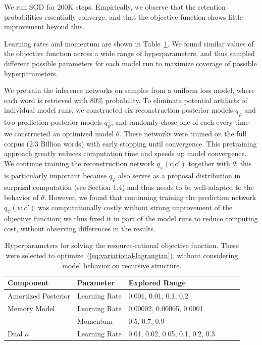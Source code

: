 We run SGD for 200K steps.
Empirically, we observe that the retention probabilities essentially converge, and that the objective function shows little improvement beyond this.


Learning rates and momentum are shown in Table~\ref{tab:hyperparameters}.
We found similar values of the objective function across a wide range of hyperparameters, and thus sampled different possible parameters for each model run to maximize coverage of possible hyperparameters.


We pretrain the inference networks on samples from a uniform loss model, where each word is
retrieved with 80\% probability. To eliminate potential artifacts of individual model runs, we constructed
six reconstruction posterior models $q_\varphi$ and two prediction posterior models $q_\psi$, and randomly chose
one of each every time we constructed an optimized model $\theta$. These networks were trained on the full
corpus (2.3 Billion words) with early stopping until convergence. This pretraining approach greatly
reduces computation time and speeds up model convergence. We continue training the reconstruction
network $q_\varphi(c|c')$ together with $\theta$; this is particularly important because $q_\varphi$ also serves as a proposal
distribution in surprisal computation (see Section 1.4) and thus needs to be well-adapted to the behavior
of $\theta$. However, we found that continuing training the prediction network $q_\psi(w|c')$ was computationally
costly without strong improvement of the objective function; we thus fixed it in part of the model runs to
reduce computing cost, without observing differences in the results.


\begin{table}
\begin{center}
	\begin{tabular}{ll||llll}
		Component & Parameter & Explored Range \\ \hline\hline
		Amortized Posterior & Learning Rate & 0.001, 0.01, 0.1, 0.2 \\
\hline		Memory Model & Learning Rate & 0.00002, 0.00005, 0.0001 \\
		           & Momentum & 0.5, 0.7, 0.9 \\
\hline		Dual $\kappa$ & Learning Rate & 0.01, 0.02, 0.05, 0.1, 0.2, 0.3\\
	\end{tabular}
	\end{center}
	\caption{Hyperparameters for solving the resource-rational objective function. These were selected to optimize~(\ref{eq:variational-lagrangian}), without considering model behavior on recursive structure.}
	\label{tab:hyperparameters}
\end{table}


